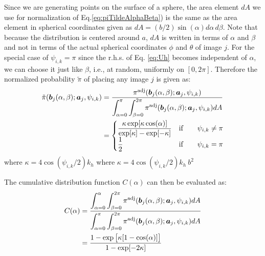     Since we are generating points on the surface of a sphere, the area element $dA$ we use for normalization of Eq.\eqref{eq:piTildeAlphaBeta}) is the same as the area element in spherical coordinates given as $dA = (b/2) \sin(\alpha) d\alpha \, d\beta$. Note that because the distribution is centered around $a$, $dA$ is written in terms of $\alpha$ and $\beta$ and not in terms of the actual spherical coordinates $\phi$ and $\theta$ of image $j$. For the special case of $\psi_{i,k} = \pi$ since the r.h.s. of Eq. \eqref{eq:Uh} becomes independent of $\alpha$, we can choose it just like $\beta$, i.e., at random, uniformly on $[0, 2\pi]$. Therefore the normalized probability $\tilde \pi$ of placing any image $j$ is given as:
    \begin{equation}
    \label{eq:piTildebj}
        \begin{aligned}
            \tilde \pi({\boldsymbol {b}}_j(\alpha, \beta);{\boldsymbol {a}}_j,\psi_{i,k}) &= \frac{\pi^\text{adj}({\boldsymbol {b}}_j(\alpha, \beta);{\boldsymbol {a}}_j,\psi_{i,k}) }{\displaystyle\int_{\alpha = 0}^\pi \int_{\beta = 0}^{2 \pi} \pi^\text{adj}({\boldsymbol {b}}_j(\alpha, \beta);{\boldsymbol {a}}_j,\psi_{i,k}) dA}\\
            &=
            \begin{cases}
                \displaystyle\frac{\kappa \exp[\kappa \cos (\alpha)]}{\exp[\kappa] - \exp[-\kappa]} & \text{if} \qquad \psi_{i,k} \ne \pi\\
                \displaystyle\frac{1}{2} & \text{if} \qquad \psi_{i,k} = \pi\\
            \end{cases}
        \end{aligned}
    \end{equation}
    \ifkhExplicitP
        where $\kappa = 4 \cos(\psi_{i,k}/2) k_h$
    \else
        where $\kappa = 4 \cos(\psi_{i,k}/2) k_h~b^2$
    \fi

    The cumulative distribution function $C(\alpha)$ can then be evaluated as:
    \begin{equation}
    \label{eq:cdf}
        \begin{aligned}
            C(\alpha) &= \frac{\displaystyle\int_{\alpha = 0}^\alpha \int_{\beta = 0}^{2 \pi} \pi^\text{adj}({\boldsymbol {b}}_j(\alpha, \beta);{\boldsymbol {a}}_j,\psi_{i,k}) dA}{\displaystyle\int_{\alpha = 0}^\pi \int_{\beta = 0}^{2 \pi} \pi^\text{adj}({\boldsymbol {b}}_j(\alpha, \beta);{\boldsymbol {a}}_j,\psi_{i,k}) dA}\\
            &= \displaystyle\frac{1 - \exp \big[\kappa [1 - \cos (\alpha)] \big]}{1 - \exp [-2 \kappa]}
        \end{aligned}
    \end{equation}

